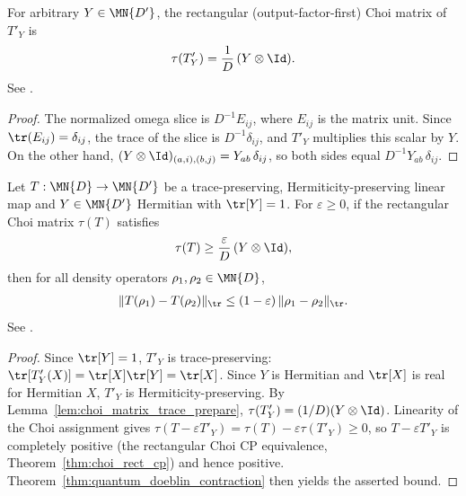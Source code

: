 \begin{lemma}
    \label{lem:choi_matrix_trace_prepare}
    \leanok
    For arbitrary $Y\in\MN{D'}$, the rectangular
    (output-factor-first) Choi matrix of $T'_Y$ is
    \begin{align}
        \tau(T'_Y) = \frac{1}{D}\,(Y\otimes\Id).
        \label{eq:choi_trace_prepare}
    \end{align}
    See \cite[Chapter~8, Eq.~(8.86)]{Wolf2012Quantum}.
\end{lemma}

\begin{proof}\leanok
    The normalized omega slice is $D^{-1}E_{ij}$, where $E_{ij}$ is the
    matrix unit.  Since $\tr(E_{ij})=\delta_{ij}$, the trace of the slice
    is $D^{-1}\delta_{ij}$, and $T'_Y$ multiplies this scalar by $Y$.
    On the other hand, $(Y\otimes\Id)_{(a,i),(b,j)} = Y_{ab}\,\delta_{ij}$,
    so both sides equal $D^{-1}Y_{ab}\,\delta_{ij}$.
\end{proof}

\begin{theorem}
    \label{thm:choi_dominated_doeblin}
    \leanok
    Let $T:\MN{D}\to\MN{D'}$ be a trace-preserving,
    Hermiticity-preserving linear map and $Y\in\MN{D'}$ Hermitian
    with $\tr[Y]=1$.  For $\varepsilon\geq0$, if
    the rectangular Choi matrix $\tau(T)$ satisfies
    \begin{align}
        \tau(T) \ge \frac{\varepsilon}{D}\,(Y\otimes\Id),
        \label{eq:choi_domination}
    \end{align}
    then for all density operators $\rho_1,\rho_2\in\MN{D}$,
    \begin{align}
        \lVert T(\rho_1)-T(\rho_2)\rVert_{\tr}
        \le (1-\varepsilon)\,\lVert\rho_1-\rho_2\rVert_{\tr}.
        \label{eq:choi_doeblin_contraction}
    \end{align}
    See \cite[Chapter~8, Eq.~(8.86)]{Wolf2012Quantum}.
\end{theorem}

\begin{proof}\leanok
    Since $\tr[Y]=1$, $T'_Y$ is trace-preserving:
    $\tr[T'_Y(X)]=\tr[X]\tr[Y]=\tr[X]$.  Since $Y$ is Hermitian and
    $\tr[X]$ is real for Hermitian $X$, $T'_Y$ is Hermiticity-preserving.
    By Lemma~\ref{lem:choi_matrix_trace_prepare},
    $\tau(T'_Y)=(1/D)(Y\otimes\Id)$. Linearity of the Choi assignment gives
    $\tau(T-\varepsilon T'_Y)=\tau(T)-\varepsilon\tau(T'_Y)
        \ge0$, so $T-\varepsilon T'_Y$ is completely positive
    (the rectangular Choi CP equivalence, Theorem~\ref{thm:choi_rect_cp})
    and hence positive. Theorem~\ref{thm:quantum_doeblin_contraction} then
    yields the asserted bound.
\end{proof}

